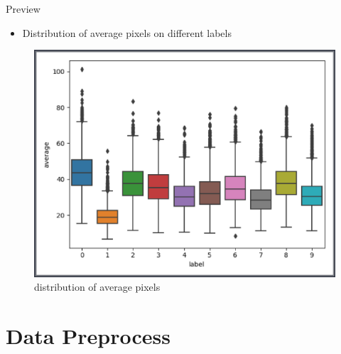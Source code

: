 \documentclass[
 size=12pt,
 paper=smartboard, %
 mode=present, %
 display=slides, %
style=tuliplab,
pauseslide,
fleqn,leqno]{powerdot}
\begin{document}
\begin{slide}{Preview}
  \begin{itemize}
    \item Distribution of average pixels on different labels
  \end{itemize}
  \pause
  \begin{figure}[h]
    \centering
    \includegraphics[width=0.5\linewidth]{figures/distribution-avg-pixels.eps}
    \caption{distribution of average pixels }
    \label{fig:distribution-avg-pixels}
  \end{figure}
\end{slide}


\section{Data Preprocess}
\end{document}
